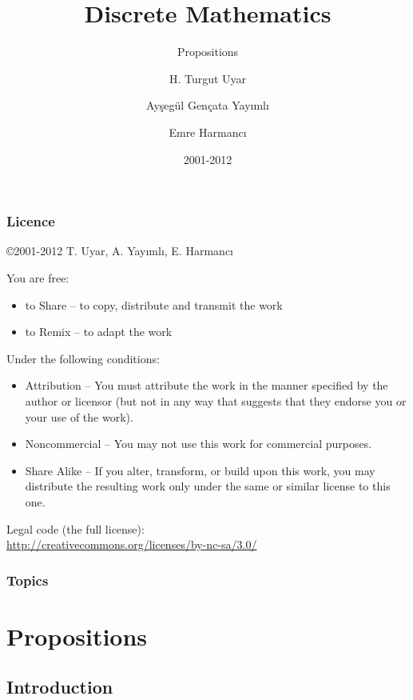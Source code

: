 \documentclass[dvipsnames]{beamer}
\title{Discrete Mathematics}
\subtitle{Propositions}
\author{H. Turgut Uyar \and Ayşegül Gençata Yayımlı \and Emre Harmancı}
\date{2001-2012}
\begin{document}
\begin{frame}
  \titlepage
\end{frame}

\begin{frame}
  \frametitle{Licence}

  \hfill
  \copyright 2001-2012 T. Uyar, A. Yayımlı, E. Harmancı

  \vfill
  \begin{tiny}
    You are free:
    \begin{itemize}
      \item to Share -- to copy, distribute and transmit the work
      \item to Remix -- to adapt the work
    \end{itemize}

    Under the following conditions:
    \begin{itemize}
      \item Attribution -- You must attribute the work in the manner specified by
        the author or licensor (but not in any way that suggests that they
        endorse you or your use of the work).

      \item Noncommercial -- You may not use this work for commercial purposes.

      \item Share Alike -- If you alter, transform, or build upon this work, you
        may distribute the resulting work only under the same or similar license
        to this one.
    \end{itemize}
  \end{tiny}

  \vfill
  Legal code (the full license):\\
  \url{http://creativecommons.org/licenses/by-nc-sa/3.0/}
\end{frame}

\begin{frame}
  \frametitle{Topics}
  \tableofcontents
\end{frame}

\section{Propositions}

\subsection{Introduction}
\end{document}
